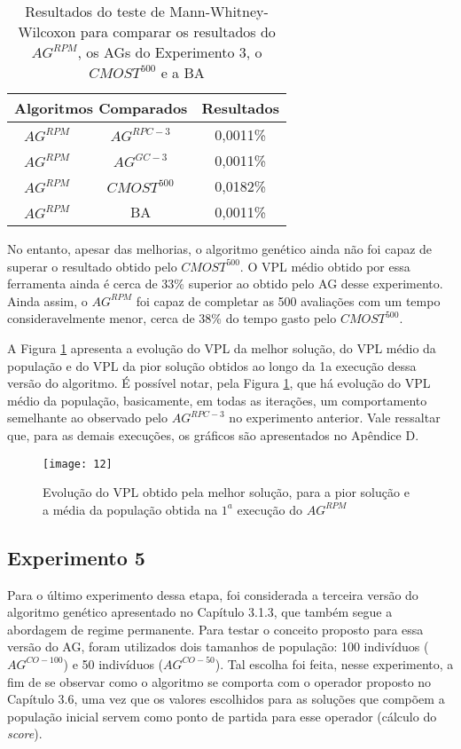 \begin{table}[H]
\centering
\caption{Resultados do teste de Mann-Whitney-Wilcoxon para comparar os resultados do $AG^{RPM}$, os AGs do Experimento 3, o $CMOST^{500}$ e a BA}
\label{tab:mw4_1}
\begin{tabular}{|c|c|c|}
\hline
\multicolumn{2}{|c|}{Algoritmos Comparados} & Resultados \\ \hline
$AG^{RPM}$ & $AG^{RPC-3}$ & 0,0011\% \\ \hline
$AG^{RPM}$ & $AG^{GC-3}$ & 0,0011\% \\ \hline
$AG^{RPM}$ & $CMOST^{500}$ & 0,0182\% \\ \hline
$AG^{RPM}$ & BA & 0,0011\% \\ \hline


\end{tabular}
\end{table}

No entanto, apesar das melhorias, o algoritmo genético ainda não foi capaz de superar o resultado obtido pelo $CMOST^{500}$. O VPL médio obtido por essa ferramenta ainda é cerca de 33\% superior ao obtido pelo AG desse experimento. Ainda assim, o $AG^{RPM}$ foi capaz de completar as 500 avaliações com um tempo consideravelmente menor, cerca de 38\% do tempo gasto pelo $CMOST^{500}$.

A Figura \ref{fig:graph4_1} apresenta a evolução do VPL da melhor solução, do VPL médio da população e do VPL da pior solução obtidos ao longo da 1a execução dessa versão do algoritmo. É possível notar, pela Figura \ref{fig:graph4_1}, que há evolução do VPL médio da população, basicamente, em todas as iterações, um comportamento semelhante ao observado pelo $AG^{RPC-3}$ no experimento anterior. Vale ressaltar que, para as demais execuções, os gráficos são apresentados no Apêndice D.

\begin{figure}[H]
\centering

\texttt{[image: 12]}

\caption{Evolução do VPL obtido pela melhor solução, para a pior solução e a média da população obtida na $1^a$ execução do $AG^{RPM}$}
\label{fig:graph4_1}
\end{figure}

\subsection{Experimento 5}

Para o último experimento dessa etapa, foi considerada a terceira versão do algoritmo genético apresentado no Capítulo 3.1.3, que também segue a abordagem de regime permanente. Para testar o conceito proposto para essa versão do AG, foram utilizados dois tamanhos de população: 100 indivíduos ($AG^{CO-{100}}$) e 50 indivíduos ($AG^{CO-{50}}$). Tal escolha foi feita, nesse experimento, a fim de se observar como o algoritmo se comporta com o operador proposto no Capítulo 3.6, uma vez que os valores escolhidos para as soluções que compõem a população inicial servem como ponto de partida para esse operador (cálculo do \textit{score}).

